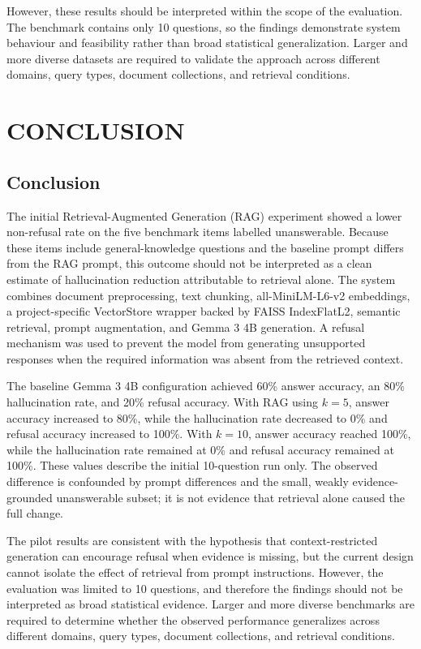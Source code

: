\documentclass[conference]{IEEEtran}
\begin{document}
However, these results should be interpreted within the scope of the evaluation. The benchmark contains only 10 questions, so the findings demonstrate system behaviour and feasibility rather than broad statistical generalization. Larger and more diverse datasets are required to validate the approach across different domains, query types, document collections, and retrieval conditions.


\section{CONCLUSION}
\subsection{Conclusion}
The initial Retrieval-Augmented Generation (RAG) experiment showed a lower non-refusal rate on the five benchmark items labelled unanswerable. Because these items include general-knowledge questions and the baseline prompt differs from the RAG prompt, this outcome should not be interpreted as a clean estimate of hallucination reduction attributable to retrieval alone. The system combines document preprocessing, text chunking, all-MiniLM-L6-v2 embeddings, a project-specific VectorStore wrapper backed by FAISS IndexFlatL2, semantic retrieval, prompt augmentation, and Gemma 3 4B generation. A refusal mechanism was used to prevent the model from generating unsupported responses when the required information was absent from the retrieved context.

The baseline Gemma 3 4B configuration achieved 60\% answer accuracy, an 80\% hallucination rate, and 20\% refusal accuracy. With RAG using \(k=5\), answer accuracy increased to 80\%, while the hallucination rate decreased to 0\% and refusal accuracy increased to 100\%. With \(k=10\), answer accuracy reached 100\%, while the hallucination rate remained at 0\% and refusal accuracy remained at 100\%. These values describe the initial 10-question run only. The observed difference is confounded by prompt differences and the small, weakly evidence-grounded unanswerable subset; it is not evidence that retrieval alone caused the full change.

The pilot results are consistent with the hypothesis that context-restricted generation can encourage refusal when evidence is missing, but the current design cannot isolate the effect of retrieval from prompt instructions. However, the evaluation was limited to 10 questions, and therefore the findings should not be interpreted as broad statistical evidence. Larger and more diverse benchmarks are required to determine whether the observed performance generalizes across different domains, query types, document collections, and retrieval conditions.
\end{document}
